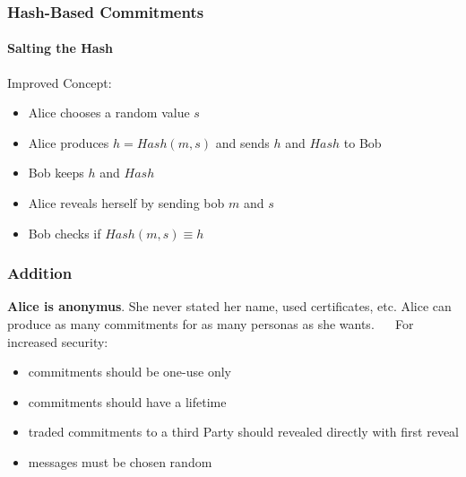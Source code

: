 \begin{frame}
	\frametitle{Hash-Based Commitments}
	\framesubtitle{Salting the Hash}
	Improved Concept: 
	\begin{itemize}
		\item Alice chooses a random value $s$
		\item Alice produces $h = Hash(m,s)$ and sends $h$ and $Hash$ to Bob
		\item Bob keeps $h$ and $Hash$
		\item Alice reveals herself by sending bob $m$ and $s$
		\item Bob checks if $Hash(m,s) \equiv h$
	\end{itemize}
\end{frame}

\begin{frame}
	\frametitle{Addition}
	\textbf{Alice is anonymus}. She never stated her name, used certificates, etc. \newline
	Alice can produce as many commitments for as many personas as she wants.  
	~\newline ~\newline
	For increased security: 
	\begin{itemize}
		\item commitments should be one-use only
		\item commitments should have a lifetime
		\item traded commitments to a third Party should revealed directly with first reveal
		\item messages must be chosen random
	\end{itemize}
\end{frame}